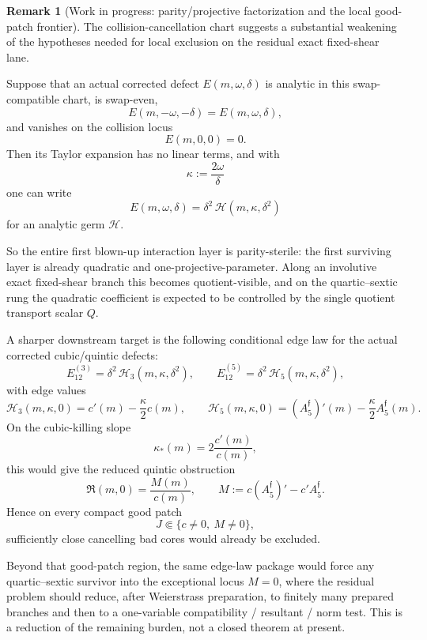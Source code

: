 \documentclass[11pt,a4paper]{amsart}
\theoremstyle{plain}
\theoremstyle{definition}
\newtheorem{remark}[theorem]{Remark}
\begin{document}
\begin{remark}[Work in progress: parity/projective factorization and the local good-patch frontier]
\label{rem:wip-parity-projective-factorization-collision-blow-up}
The collision-cancellation chart suggests a substantial weakening of the
hypotheses needed for local exclusion on the residual exact fixed-shear lane.

Suppose that an actual corrected defect $E(m,\omega,\delta)$ is analytic in
this swap-compatible chart, is swap-even,
\[
E(m,-\omega,-\delta)=E(m,\omega,\delta),
\]
and vanishes on the collision locus
\[
E(m,0,0)=0.
\]
Then its Taylor expansion has no linear terms, and with
\[
\kappa:=\frac{2\omega}{\delta}
\]
one can write
\[
E(m,\omega,\delta)=\delta^2\,\mathcal H(m,\kappa,\delta^2)
\]
for an analytic germ $\mathcal H$.

So the entire first blown-up interaction layer is parity-sterile: the first
surviving layer is already quadratic and one-projective-parameter. Along an
involutive exact fixed-shear branch this becomes quotient-visible, and on the
quartic--sextic rung the quadratic coefficient is expected to be controlled by
the single quotient transport scalar $Q$.

A sharper downstream target is the following conditional edge law for the
actual corrected cubic/quintic defects:
\[
E_{12}^{(3)}=\delta^2\,\mathcal H_3(m,\kappa,\delta^2),
\qquad
E_{12}^{(5)}=\delta^2\,\mathcal H_5(m,\kappa,\delta^2),
\]
with edge values
\[
\mathcal H_3(m,\kappa,0)=c'(m)-\frac{\kappa}{2}c(m),
\qquad
\mathcal H_5(m,\kappa,0)=(A_5^{\mathfrak f})'(m)-\frac{\kappa}{2}A_5^{\mathfrak f}(m).
\]
On the cubic-killing slope
\[
\kappa_*(m)=2\frac{c'(m)}{c(m)},
\]
this would give the reduced quintic obstruction
\[
\mathfrak R(m,0)=\frac{M(m)}{c(m)},
\qquad
M:=c(A_5^{\mathfrak f})'-c'A_5^{\mathfrak f}.
\]
Hence on every compact good patch
\[
J\Subset\{c\neq 0,\ M\neq 0\},
\]
sufficiently close cancelling bad cores would already be excluded.

Beyond that good-patch region, the same edge-law package would force any
quartic--sextic survivor into the exceptional locus $M=0$, where the residual
problem should reduce, after Weierstrass preparation, to finitely many prepared
branches and then to a one-variable compatibility / resultant / norm test.
This is a reduction of the remaining burden, not a closed theorem at present.
\end{remark}
\end{document}
